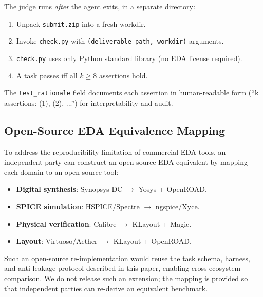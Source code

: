 The judge runs \emph{after} the agent exits, in a separate directory:
\begin{enumerate}
    \item Unpack \texttt{submit.zip} into a fresh workdir.
    \item Invoke \texttt{check.py} with \texttt{(deliverable\_path, workdir)} arguments.
    \item \texttt{check.py} uses only Python standard library (no EDA license required).
    \item A task passes iff all $k \geq 8$ assertions hold.
\end{enumerate}
The \texttt{test\_rationale} field documents each assertion in human-readable form (``k assertions: (1), (2), ...'') for interpretability and audit.

\subsection{Open-Source EDA Equivalence Mapping}
\label{sec:repro-details}

To address the reproducibility limitation of commercial EDA tools, an independent party can construct an open-source-EDA equivalent by mapping each domain to an open-source tool:
{\sloppy\begin{itemize}
    \item \textbf{Digital synthesis}: Synopsys DC $\to$ Yosys + OpenROAD.
    \item \textbf{SPICE simulation}: HSPICE/Spectre $\to$ ngspice/Xyce.
    \item \textbf{Physical verification}: Calibre $\to$ KLayout + Magic.
    \item \textbf{Layout}: Virtuoso/Aether $\to$ KLayout + OpenROAD.
\end{itemize}}
Such an open-source re-implementation would reuse the task schema, harness, and anti-leakage protocol described in this paper, enabling cross-ecosystem comparison. We do not release such an extension; the mapping is provided so that independent parties can re-derive an equivalent benchmark.
